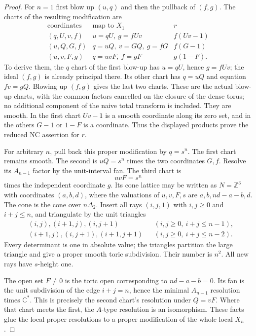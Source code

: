 \begin{proof}

For $n=1$ first blow up $(u,q)$ and then the pullback
of $(f,g)$. The charts of the resulting modification are
\[
\begin{array}{c|c|c}
 \text{coordinates}&\text{map to }X_1&r\\\hline
 (q,U,v,f)&u=qU,\ g=fUv&f(Uv-1)\\
 (u,Q,G,f)&q=uQ,\ v=GQ,\ g=fG&f(G-1)\\
 (u,v,F,g)&q=uvF,\ f=gF&g(1-F).
\end{array}
\]
To derive them, the $q$ chart of the first blow-up
has $u=qU$, hence $g=fUv$; the ideal $(f,g)$ is
already principal there. Its other chart has
$q=uQ$ and equation $fv=gQ$. Blowing up $(f,g)$
gives the last two charts. These are the actual
blow-up charts, with the common factors cancelled
on the closure of the dense torus; no additional
component of the naive total transform is included.
They are smooth. In the first chart $Uv-1$ is a
smooth coordinate along its zero set, and in the
others $G-1$ or $1-F$ is a coordinate. Thus the
displayed products prove the reduced NC assertion
for $r$.

For arbitrary $n$, pull back this proper modification
by $q=s^n$. The first chart remains smooth. The
second is $uQ=s^n$ times the two coordinates $G,f$.
Resolve its $A_{n-1}$ factor by the unit-interval fan.
The third chart is
\[
 uvF=s^n
\]
times the independent coordinate $g$. Its cone lattice
may be written as $N=\mathbb Z^3$ with coordinates
$(a,b,d)$, where the valuations of $u,v,F,s$ are
$a,b,nd-a-b,d$. The cone is the cone over
$n\Delta_2$. Insert all rays $(i,j,1)$ with
$i,j\ge0$ and $i+j\le n$, and triangulate by the
unit triangles
\[
\begin{aligned}
 &(i,j),(i+1,j),(i,j+1) &&(i,j\ge0,\ i+j\le n-1),\\
 &(i+1,j),(i,j+1),(i+1,j+1)
                       &&(i,j\ge0,\ i+j\le n-2).
\end{aligned}
\]
Every determinant is one in absolute value; the
triangles partition the large triangle and give a
proper smooth toric subdivision. Their number is
$n^2$. All new rays have $s$-height one.

The open set $F\ne0$ is the toric open corresponding
to $nd-a-b=0$. Its fan is the unit subdivision of
the edge $i+j=n$, hence the minimal $A_{n-1}$
resolution times $\mathbb C^*$. This is precisely
the second chart's resolution under $Q=vF$.
Where that chart meets the first, the $A$-type
resolution is an isomorphism. These facts glue
the local proper resolutions to a proper
modification of the whole local $X_n$.


\end{proof}
